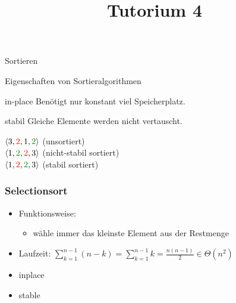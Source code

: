 
\title[Algorithmen I SS 14]{Tutorium 4}

\usepackage{alltt}





\begin{frame}
  \maketitle
\end{frame}


\begin{frame}
	\begin{center}
		\Huge
		Sortieren
	\end{center}
\end{frame}

\begin{frame}{Eigenschaften von Sortieralgorithmen}
	\begin{block}{in-place}
		Benötigt nur konstant viel Speicherplatz.
	\end{block}
	\begin{block}{stabil}
		Gleiche Elemente werden nicht vertauscht.

		$\langle 3, {\color{red}{2}}, 1, {\color{english}{2}}\rangle$ (unsortiert)\\
		$\langle 1, {\color{english}{2}}, {\color{red}{2}}, 3\rangle$ (nicht-stabil sortiert)\\
		$\langle 1, {\color{red}{2}}, {\color{english}{2}}, 3\rangle$ (stabil sortiert)
	\end{block}
\end{frame}

\begin{frame}
	\frametitle{Selectionsort}
	\begin{itemize}
		\item Funktionsweise:
		\begin{itemize}
			\item wähle immer das kleinste Element aus der Restmenge
		\end{itemize}
		\item Laufzeit: $\sum_{k=1}^{n-1} (n - k) = \sum_{k=1}^{n-1} k = \frac{n(n-1)}{2} \in \Theta(n^2)$
		\item {\color{english}inplace}
		\item {\color{english}stable}
	\end{itemize}
\end{frame}

